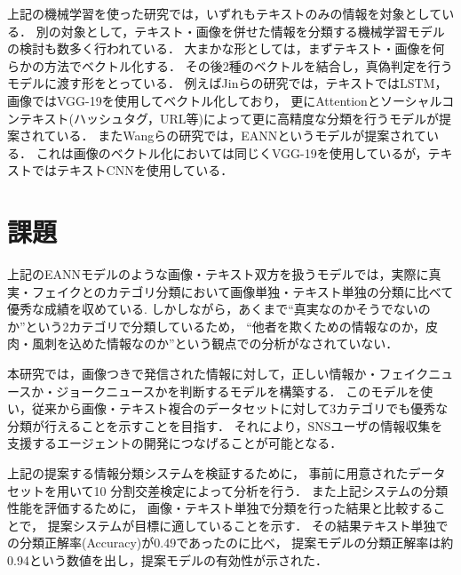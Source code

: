 上記の機械学習を使った研究では，いずれもテキストのみの情報を対象としている．
別の対象として，テキスト・画像を併せた情報を分類する機械学習モデルの検討も数多く行われている．
大まかな形としては，まずテキスト・画像を何らかの方法でベクトル化する．
その後2種のベクトルを結合し，真偽判定を行うモデルに渡す形をとっている．
例えばJinらの研究\cite{jin}では，テキストではLSTM，画像ではVGG-19を使用してベクトル化しており，
更にAttentionとソーシャルコンテキスト(ハッシュタグ，URL等)によって更に高精度な分類を行うモデルが提案されている．
またWangらの研究\cite{eann}では，EANNというモデルが提案されている．
これは画像のベクトル化においては同じくVGG-19を使用しているが，テキストではテキストCNNを使用している．

\section{課題}
上記のEANNモデルのような画像・テキスト双方を扱うモデルでは，実際に真実・フェイクとのカテゴリ分類において画像単独・テキスト単独の分類に比べて優秀な成績を収めている\cite{eann}.\@
しかしながら，あくまで``真実なのかそうでないのか''という2カテゴリで分類しているため，
``他者を欺くための情報なのか，皮肉・風刺を込めた情報なのか''という観点での分析がなされていない．

本研究では，画像つきで発信された情報に対して，正しい情報か・フェイクニュースか・ジョークニュースかを判断するモデルを構築する．
このモデルを使い，従来から画像・テキスト複合のデータセットに対して3カテゴリでも優秀な分類が行えることを示すことを目指す．
それにより，SNSユーザの情報収集を支援するエージェントの開発につなげることが可能となる．

上記の提案する情報分類システムを検証するために，
事前に用意されたデータセットを用いて10 分割交差検定によって分析を行う．
また上記システムの分類性能を評価するために，
画像・テキスト単独で分類を行った結果と比較することで，
提案システムが目標に適していることを示す．
その結果テキスト単独での分類正解率(Accuracy)が0.49であったのに比べ，
提案モデルの分類正解率は約0.94という数値を出し，提案モデルの有効性が示された．

% 
